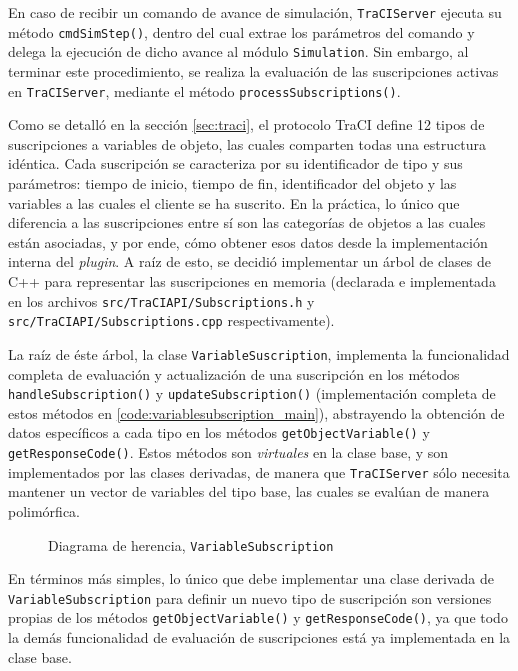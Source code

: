 En caso de recibir un comando de avance de simulación, \texttt{TraCIServer} ejecuta su método \texttt{cmdSimStep()}, dentro del cual extrae los parámetros del comando y delega la ejecución de dicho avance al módulo \texttt{Simulation}. Sin embargo, al terminar este procedimiento, se realiza la evaluación de las suscripciones activas en \texttt{TraCIServer}, mediante el método \texttt{processSubscriptions()}.

Como se detalló en la sección \ref{sec:traci}, el protocolo TraCI define 12 tipos de suscripciones a variables de objeto, las cuales comparten todas una estructura idéntica. Cada suscripción se caracteriza por su identificador de tipo y sus parámetros: tiempo de inicio, tiempo de fin, identificador del objeto y las variables a las cuales el cliente se ha suscrito. En la práctica, lo único que diferencia a las suscripciones entre sí son las categorías de objetos a las cuales están asociadas, y por ende, cómo obtener esos datos desde la implementación interna del \emph{plugin}. A raíz de esto, se decidió implementar un árbol de clases de C++ para representar las suscripciones en memoria (declarada e implementada en los archivos \texttt{src/TraCIAPI/Subscriptions.h} y \texttt{src/TraCIAPI/Subscriptions.cpp} respectivamente).

La raíz de éste árbol, la clase \texttt{VariableSuscription}, implementa la funcionalidad completa de evaluación y actualización de una suscripción en los métodos \texttt{handleSubscription()} y \texttt{updateSubscription()} (implementación completa de estos métodos en \ref{code:variablesubscription_main}), abstrayendo la obtención de datos específicos a cada tipo en los métodos \texttt{getObjectVariable()} y \texttt{getResponseCode()}. Estos métodos son \emph{virtuales} en la clase base, y son implementados por las clases derivadas, de manera que \texttt{TraCIServer} sólo necesita mantener un vector de variables del tipo base, las cuales se evalúan de manera polimórfica.

\begin{figure}
    \centering
    
    \caption{Diagrama de herencia, \texttt{VariableSubscription}}
    \label{fig:cd_variablesub}
\end{figure}

En términos más simples, lo único que debe implementar una clase derivada de \texttt{VariableSubscription} para definir un nuevo tipo de suscripción son versiones propias de los métodos \texttt{getObjectVariable()} y \texttt{getResponseCode()}, ya que todo la demás funcionalidad de evaluación de suscripciones está ya implementada en la clase base. 

